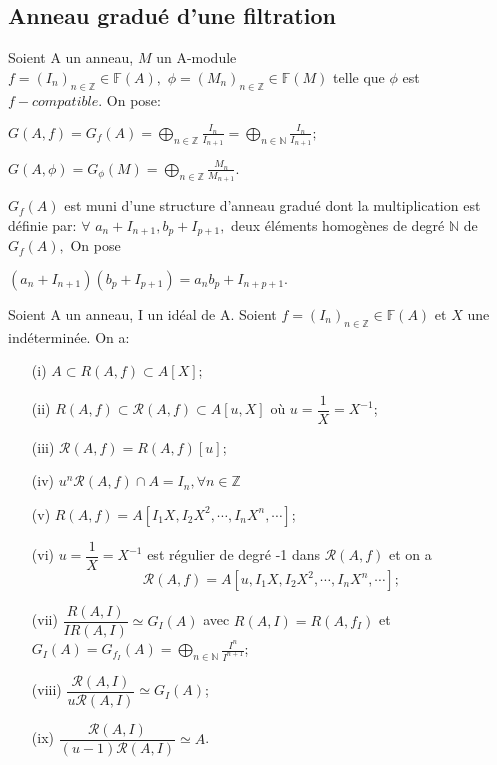 \subsection{Anneau gradué d'une filtration}
\begin{madefinition}
	Soient A un anneau, $M$ un A-module\\
	$f=(I_{n})_{n\in \mathbb{Z}}\in \mathbb{F}(A),$ $\phi =(M_{n})_{n\in \mathbb{Z}}\in \mathbb{F}(M)$ telle que $\phi $ est $f-compatible$. On pose:
	
	$G(A,f)= G_{f}(A)=\displaystyle \bigoplus_{n \in \mathbb{Z}}{\frac{I_{n}}{I_{n+1}}} = \displaystyle \bigoplus_{n \in \mathbb{N}}{\frac{I_{n}}{I_{n+1}}}; $
	
	$G(A, \phi)=G_{\phi }(M)=\displaystyle \bigoplus_{n \in \mathbb{Z}}{\frac{M_{n}}{M_{n+1}}}.$
	
	$G_{f}(A)$ est muni d'une structure d'anneau gradué dont la multiplication est définie par:
	$ \forall $  $a_{n}+I_{n+1},b_{p}+I_{p+1},$ deux éléments homogènes de degré $\mathbb{N}$ de $G_{f}(A),$ On pose
	
	$(a_{n}+I_{n+1})(b_{p}+I_{p+1})=a_{n}b_{p}+I_{n+p+1}.$
\end{madefinition}
\begin{maproposition}
	Soient A un anneau, I un idéal de A. Soient $f = (I_n)_{n \in \mathbb{Z}} \in \mathbb{F}(A)$ et $X$ une indéterminée. On a: 
	\begin{enumerate}
		\item[(i)] $A \subset R(A,f) \subset A[X]$;
		\item[(ii)] $R(A,f) \subset \mathcal{R}(A,f) \subset A[u,X]$ où $u = \dfrac{1}{X} = X^{-1}$;
		\item[(iii)] $\mathcal{R}(A,f) = R(A,f)[u] $;
		\item[(iv)] $u^n\mathcal{R}(A,f) \cap  A = I_n, \forall n \in \mathbb{Z}$
		\item[(v)] $R(A,f) = A[I_1X,I_2X^2, \cdots, I_nX^n, \cdots] $;
		\item[(vi)] $u=\dfrac{1}{X} = X ^{-1}$ est régulier de degré -1 dans $\mathcal{R}(A,f)$ et on a \[ \mathcal{R}(A,f) = A[u,I_1X,I_2X^2, \cdots, I_nX^n, \cdots ]; \]
		\item[(vii)] $ \dfrac{R(A,I)}{IR(A,I)} \simeq G_I(A) $ avec $R(A,I) = R(A, f_I) $ et $G_I(A) = G_{f_{I}}(A) = \displaystyle \bigoplus_{n \in\mathbb{N}}{\frac{I^{n}}{I^{n+1}}} $;
		\item[(viii)] $ \dfrac{\mathcal{R}(A,I)}{u\mathcal{R}(A,I)} \simeq G_I(A) $;
		\item[(ix)] $ \dfrac{\mathcal{R}(A,I)}{(u-1)\mathcal{R}(A,I)} \simeq A $.
	\end{enumerate} 
\end{maproposition}
